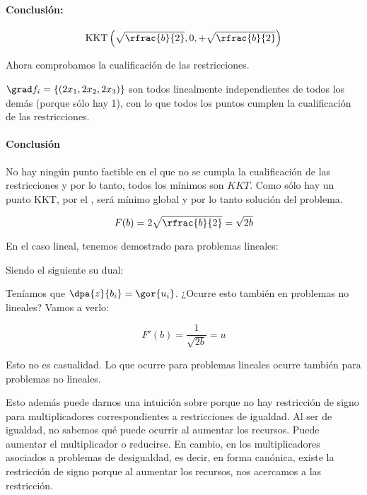 \begin{problem}[1]
\paragraph{Conclusión:} 

\[
	\KKT{\sqrt{\rfrac{b}{2}},0,+\sqrt{\rfrac{b}{2}}}
\]

Ahora comprobamos la cualificación de las restricciones.

$\grad f_i = \{(2x_1,2x_2,2x_3)\}$ son todos linealmente independientes de todos los demás (porque sólo hay 1), con lo que todos los puntos cumplen la cualificación de las restricciones. 

\paragraph{Conclusión} No hay ningún punto factible en el que no se cumpla la cualificación de las restricciones y por lo tanto, todos los mínimos son $KKT$.
%
Como sólo hay un punto KKT, por el , será mínimo global y por lo tanto solución del problema.

\spart 

\[
	F(b) = 2\sqrt{\rfrac{b}{2}} = \sqrt{2b}
\]

En el caso lineal, tenemos demostrado para problemas lineales:

\begin{ioprob}
\end{ioprob}

Siendo el siguiente su dual:

\begin{ioprob}
\end{ioprob}

Teníamos que $\dpa{z}{b_i} = \gor{u_i}$. ¿Ocurre esto también en problemas no lineales? Vamos a verlo:

\[
	F'(b) = \frac{1}{\sqrt{2b}} = u
\]

\obs Esto no es casualidad.
%
Lo que ocurre para problemas lineales ocurre también para problemas no lineales. 

Esto además puede darnos una intuición sobre porque no hay restricción de signo para multiplicadores correspondientes a restricciones de igualdad. 
Al ser de igualdad, no sabemos qué puede ocurrir al aumentar los recursos.
%
Puede aumentar el multiplicador o reducirse.
En cambio, en los multiplicadores asociados a problemas de desigualdad, es decir, en forma canónica, existe la restricción de signo porque al aumentar los recursos, nos acercamos a las restricción. 


\end{problem}




